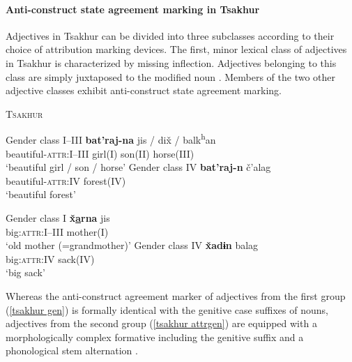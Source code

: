 \paragraph{Anti-construct state agreement marking in Tsakhur}
Adjectives in Tsakhur can be divided into three subclasses according to their choice of attribution marking devices. The first, minor lexical class of adjectives in Tsakhur is characterized by missing inflection. Adjectives belonging to this class are simply juxtaposed to the modified noun \citep[383]{talibov2004}. Members of the two other adjective classes exhibit anti-construct state agreement marking.
\begin{exe}
\ex \textsc{Tsakhur} \citep[382]{talibov2004}
\begin{xlist}
\ex	\label{tsakhur gen}
\begin{xlist}
\ex	Gender class I–III
\gll	\textbf{bat'raj-na} jis / dix̌ / balk\textsuperscript{h}an\\
	 beautiful-\textsc{attr:I–III} girl(\textsc{I}) { } son(\textsc{II}) { } horse(\textsc{III})\\
\glt	 ‘beautiful girl / son / horse’
\ex	Gender class IV
\gll	\textbf{bat'raj-n}	č'alag\\
	beautiful-\textsc{attr:IV} forest(\textsc{IV})\\
\glt	‘beautiful forest’
\end{xlist}
\ex \label{tsakhur attrgen}
\begin{xlist}
\ex	Gender class I
\gll	\textbf{x̌\underline{a}rna} jis\\
	big:\textsc{attr:I–III} mother(\textsc{I})\\
\glt	‘old mother (=grandmother)’
\ex	Gender class IV
\gll	\textbf{x̌adɨn} balag\\
	big:\textsc{attr:IV} sack(\textsc{IV})\\
\glt	‘big sack’
\end{xlist}
\end{xlist}
\end{exe}
Whereas the anti-construct agreement marker of adjectives from the first group (\ref{tsakhur gen}) is formally identical with the genitive case suffixes of nouns, adjectives from the second group (\ref{tsakhur attrgen}) are equipped with a morphologically complex formative including the genitive suffix and a phonological stem alternation \citep[382]{talibov2004}.

